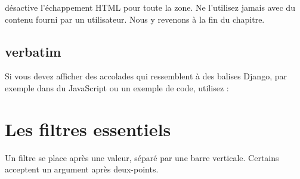 \begin{attention}
 désactive l'échappement HTML pour toute la zone. Ne
l'utilisez jamais avec du contenu fourni par un utilisateur. Nous y revenons à la
fin du chapitre.
\end{attention}

\subsection{verbatim}

Si vous devez afficher des accolades qui ressemblent à des balises Django, par
exemple dans du JavaScript ou un exemple de code, utilisez  :


\section{Les filtres essentiels}

Un filtre se place après une valeur, séparé par une barre verticale. Certains
acceptent un argument après deux-points.

